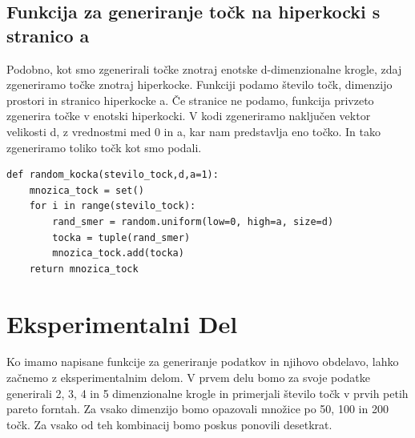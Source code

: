 \documentclass{article}
\begin{document}
\subsection{Funkcija za generiranje točk na hiperkocki s stranico a}
Podobno, kot smo zgenerirali točke znotraj enotske d-dimenzionalne krogle, zdaj zgeneriramo točke znotraj hiperkocke. Funkciji podamo število točk, dimenzijo prostori in stranico hiperkocke a. Če stranice ne podamo, funkcija privzeto zgenerira točke v enotski hiperkocki. V kodi zgeneriramo naključen vektor velikosti d, z vrednostmi med 0 in a, kar nam predstavlja eno točko. In tako zgeneriramo toliko točk kot smo podali.
\begin{verbatim}
def random_kocka(stevilo_tock,d,a=1): 
    mnozica_tock = set()
    for i in range(stevilo_tock):
        rand_smer = random.uniform(low=0, high=a, size=d)
        tocka = tuple(rand_smer)
        mnozica_tock.add(tocka)
    return mnozica_tock
\end{verbatim}





\section{Eksperimentalni Del}
Ko imamo napisane funkcije za generiranje podatkov in njihovo obdelavo, lahko začnemo z eksperimentalnim delom. 
V prvem delu bomo za svoje podatke generirali 2, 3, 4 in 5 dimenzionalne krogle in primerjali število točk v prvih petih pareto forntah. Za vsako dimenzijo bomo opazovali množice po 50, 100 in 200 točk. Za vsako od teh kombinacij bomo poskus ponovili desetkrat. 
\
\end{document}
